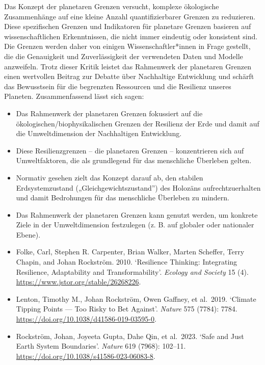\documentclass[
  nswissgerman,
  a4paper,
  DIV=11,
  numbers=noendperiod,
  oneside,
  openany]{scrreprt}
\begin{document}
Das Konzept der planetaren Grenzen versucht, komplexe ökologische
Zusammenhänge auf eine kleine Anzahl quantifizierbarer Grenzen zu
reduzieren. Diese spezifischen Grenzen und Indikatoren für planetare
Grenzen basieren auf wissenschaftlichen Erkenntnissen, die nicht immer
eindeutig oder konsistent sind. Die Grenzen werden daher von einigen
Wissenschaftler*innen in Frage gestellt, die die Genauigkeit und
Zuverlässigkeit der verwendeten Daten und Modelle anzweifeln. Trotz
dieser Kritik leistet das Rahmenwerk der planetaren Grenzen einen
wertvollen Beitrag zur Debatte über Nachhaltige Entwicklung und schärft
das Bewusstsein für die begrenzten Ressourcen und die Resilienz unseres
Planeten. Zusammenfassend lässt sich sagen:

\begin{itemize}
\item
  Das Rahmenwerk der planetaren Grenzen fokussiert auf die
  ökologischen/biophysikalischen Grenzen der Resilienz der Erde und
  damit auf die Umweltdimension der Nachhaltigen Entwicklung.
\item
  Diese Resilienzgrenzen -- die planetaren Grenzen -- konzentrieren sich
  auf Umweltfaktoren, die als grundlegend für das menschliche Überleben
  gelten.
\item
  Normativ gesehen zielt das Konzept darauf ab, den stabilen
  Erdsystemzustand („Gleichgewichtszustand'') des Holozäns
  aufrechtzuerhalten und damit Bedrohungen für das menschliche Überleben
  zu mindern.
\item
  Das Rahmenwerk der planetaren Grenzen kann genutzt werden, um konkrete
  Ziele in der Umweltdimension festzulegen (z. B. auf globaler oder
  nationaler Ebene).
\end{itemize}

\begin{tcolorbox}[enhanced jigsaw, arc=.35mm, bottomrule=.15mm, bottomtitle=1mm, breakable, colback=white, colbacktitle=quarto-callout-caution-color!10!white, colframe=quarto-callout-caution-color-frame, coltitle=black, left=2mm, leftrule=.75mm, opacityback=0, opacitybacktitle=0.6, rightrule=.15mm, title={Weiterführende Literatur}, titlerule=0mm, toprule=.15mm, toptitle=1mm]

\begin{itemize}
\item
  Folke, Carl, Stephen R. Carpenter, Brian Walker, Marten Scheffer,
  Terry Chapin, and Johan Rockström. 2010. `Resilience Thinking:
  Integrating Resilience, Adaptability and Transformability'.
  \emph{Ecology and Society} 15 (4).
  \url{https://www.jstor.org/stable/26268226}.
\item
  Lenton, Timothy M., Johan Rockström, Owen Gaffney, et al.~2019.
  `Climate Tipping Points --- Too Risky to Bet Against'. \emph{Nature}
  575 (7784): 7784. \url{https://doi.org/10.1038/d41586-019-03595-0}.
\item
  Rockström, Johan, Joyeeta Gupta, Dahe Qin, et al.~2023. `Safe and Just
  Earth System Boundaries'. \emph{Nature} 619 (7968): 102--11.
  \url{https://doi.org/10.1038/s41586-023-06083-8}.
\end{itemize}

\end{tcolorbox}
\end{document}
